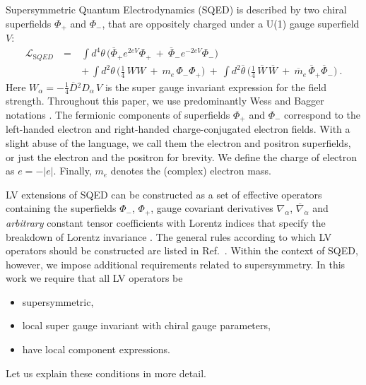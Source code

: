 \documentclass[12pt]{revtex4}
\begin{document}
Supersymmetric Quantum Electrodynamics (SQED) is described
by two chiral superfields $ \Phi_+ $ and $ \Phi_- $, that 
are oppositely charged under a U(1) gauge superfield $ V $: 
\begin{eqnarray}
\mathcal{L}_{\mathrm SQED} & ~=~
&
\int d^4\theta\, \Big(
   \overline{\Phi}_+ e^{2eV} \Phi_+ ~+~
   \overline{\Phi}_- e^{-2eV} {\Phi}_-  \Big) \\
\label{SQED}
&& +~   
\int d^2\theta\, \Big( \frac{1}{4}\,  WW ~+~m_e\, \Phi_-\Phi_+ \Big) ~+~
\int d^2\overline{\theta}\, 
\Big( \frac{1}{4}\, \overline{W}\,\overline{W} ~+~ 
\overline{m}_e\, \overline{\Phi}_+\overline{\Phi}_- \Big)~.
\nonumber
\end{eqnarray}
%
Here $ W_\alpha = - \frac{1}{4} \overline{D}{}^2 D_\alpha\, {V} $ 
is the super gauge invariant expression for the field strength. 
Throughout this paper, we use predominantly Wess and
Bagger notations \cite{Wess:1992cp}. The fermionic components of
superfields $ \Phi_+ $ and $ \Phi_- $ correspond to the left-handed
electron and right-handed charge-conjugated electron fields. With a   
slight abuse of the language, we call them the electron and positron 
superfields, or just the electron and the positron for brevity. We
define the charge of electron as $ e = - | e | $. 
Finally, $m_e$ denotes the (complex) electron mass. 


LV extensions of SQED can be constructed as a set of effective
operators containing the superfields $\Phi_-$, $\Phi_+$,
gauge covariant derivatives $ \nabla_\alpha $, 
$ \overline{\nabla}_{\dot\alpha} $ and {\em arbitrary} constant tensor
coefficients with Lorentz indices  that specify the
breakdown of Lorentz invariance \cite{GrootNibbelink:2004za}. 
The general rules according to which LV operators should be
constructed are listed in Ref.~\cite{MP:}. 
Within the context of SQED, however, we impose additional
requirements related to supersymmetry.
In this work we require that all LV operators be  
\begin{itemize}
\item supersymmetric, 
\item local super gauge invariant with chiral gauge parameters, 
\item have local component expressions. 
\end{itemize}
Let us explain these conditions in more detail. 
\end{document}
